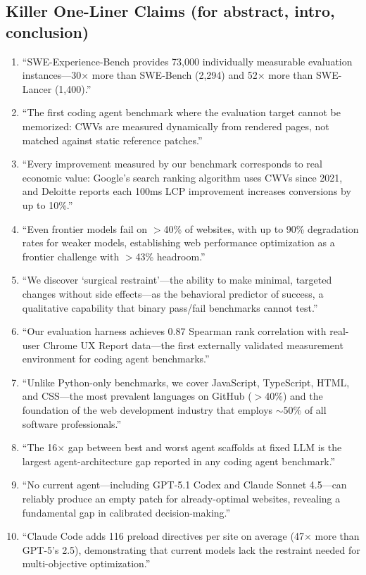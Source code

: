 \subsection{Killer One-Liner Claims (for abstract, intro, conclusion)}

\begin{enumerate}
    \item ``SWE-Experience-Bench provides 73,000 individually measurable evaluation instances---30$\times$ more than SWE-Bench (2,294) and 52$\times$ more than SWE-Lancer (1,400).''

    \item ``The first coding agent benchmark where the evaluation target cannot be memorized: CWVs are measured dynamically from rendered pages, not matched against static reference patches.''

    \item ``Every improvement measured by our benchmark corresponds to real economic value: Google's search ranking algorithm uses CWVs since 2021, and Deloitte reports each 100ms LCP improvement increases conversions by up to 10\%.''

    \item ``Even frontier models fail on $>$40\% of websites, with up to 90\% degradation rates for weaker models, establishing web performance optimization as a frontier challenge with $>$43\% headroom.''

    \item ``We discover `surgical restraint'---the ability to make minimal, targeted changes without side effects---as the behavioral predictor of success, a qualitative capability that binary pass/fail benchmarks cannot test.''

    \item ``Our evaluation harness achieves 0.87 Spearman rank correlation with real-user Chrome UX Report data---the first externally validated measurement environment for coding agent benchmarks.''

    \item ``Unlike Python-only benchmarks, we cover JavaScript, TypeScript, HTML, and CSS---the most prevalent languages on GitHub ($>$40\%) and the foundation of the web development industry that employs $\sim$50\% of all software professionals.''

    \item ``The 16$\times$ gap between best and worst agent scaffolds at fixed LLM is the largest agent-architecture gap reported in any coding agent benchmark.''

    \item ``No current agent---including GPT-5.1 Codex and Claude Sonnet 4.5---can reliably produce an empty patch for already-optimal websites, revealing a fundamental gap in calibrated decision-making.''

    \item ``Claude Code adds 116 preload directives per site on average (47$\times$ more than GPT-5's 2.5), demonstrating that current models lack the restraint needed for multi-objective optimization.''
\end{enumerate}
